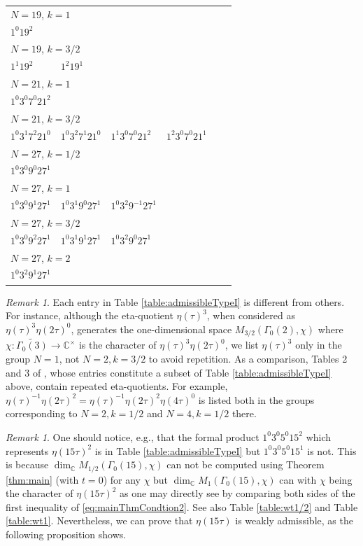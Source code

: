 \documentclass[12pt]{amsart}
\numberwithin{equation}{section}
\theoremstyle{plain}
\theoremstyle{definition}
\theoremstyle{remark}
\newtheorem{rema}[thm]{Remark}
\newcommand\numC{\mathbb{C}}
\begin{document}
\begin{longtable}{llllll}
\midrule
\multicolumn{6}{l}{$N=19$, $k=1$}\\
$1^{0}19^{2}$ & &&&&\\
\midrule
\multicolumn{6}{l}{$N=19$, $k=3/2$}\\
$1^{1}19^{2}$ & $1^{2}19^{1}$ & &&&\\
\midrule
\multicolumn{6}{l}{$N=21$, $k=1$}\\
$1^{0}3^{0}7^{0}21^{2}$ & &&&&\\
\midrule
\multicolumn{6}{l}{$N=21$, $k=3/2$}\\
$1^{0}3^{1}7^{2}21^{0}$ & $1^{0}3^{2}7^{1}21^{0}$ & $1^{1}3^{0}7^{0}21^{2}$ & $1^{2}3^{0}7^{0}21^{1}$ & &\\
\midrule
\multicolumn{6}{l}{$N=27$, $k=1/2$}\\
$1^{0}3^{0}9^{0}27^{1}$ & &&&&\\
\midrule
\multicolumn{6}{l}{$N=27$, $k=1$}\\
$1^{0}3^{0}9^{1}27^{1}$ & $1^{0}3^{1}9^{0}27^{1}$ & $1^{0}3^{2}9^{-1}27^{1}$ & &&\\
\midrule
\multicolumn{6}{l}{$N=27$, $k=3/2$}\\
$1^{0}3^{0}9^{2}27^{1}$ & $1^{0}3^{1}9^{1}27^{1}$ & $1^{0}3^{2}9^{0}27^{1}$ & &&\\
\midrule
\multicolumn{6}{l}{$N=27$, $k=2$}\\
$1^{0}3^{2}9^{1}27^{1}$ & &&&&\\
\end{longtable}

\begin{rema}
Each entry in Table \ref{table:admissibleTypeI} is different from others. For instance, although the eta-quotient $\eta(\tau)^3$, when considered as $\eta(\tau)^3\eta(2\tau)^0$, generates the one-dimensional space $M_{3/2}(\Gamma_0(2),\chi)$ where $\chi\colon\widetilde{\Gamma_0(3)}\rightarrow\numC^\times$ is the character of $\eta(\tau)^3\eta(2\tau)^0$, we list $\eta(\tau)^3$ only in the group $N=1$, not $N=2,k=3/2$ to avoid repetition. As a comparison, Tables 2 and 3 of \cite{ZZ23}, whose entries constitute a subset of Table \ref{table:admissibleTypeI} above, contain repeated eta-quotients. For example, $\eta(\tau)^{-1}\eta(2\tau)^2=\eta(\tau)^{-1}\eta(2\tau)^2\eta(4\tau)^0$ is listed both in the groups corresponding to $N=2,k=1/2$ and $N=4,k=1/2$ there.
\end{rema}

\begin{rema}
One should notice, e.g., that the formal product $1^{0}3^{0}5^{0}15^{2}$ which represents $\eta(15\tau)^2$ is in Table \ref{table:admissibleTypeI} but $1^{0}3^{0}5^{0}15^{1}$ is not. This is because $\dim_\numC M_{1/2}(\Gamma_0(15),\chi)$ can not be computed using Theorem \ref{thm:main} (with $t=0$) for any $\chi$ but $\dim_\numC M_{1}(\Gamma_0(15),\chi)$ can with $\chi$ being the character of $\eta(15\tau)^2$ as one may directly see by comparing both sides of the first inequality of \eqref{eq:mainThmCondtion2}. See also Table \ref{table:wt1/2} and Table \ref{table:wt1}. Nevertheless, we can prove that $\eta(15\tau)$ is weakly admissible, as the following proposition shows.
\end{rema}
\end{document}
